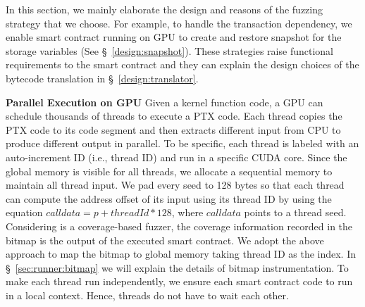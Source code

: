 In this section, we mainly elaborate the design and reasons of the fuzzing strategy that we choose. 
For example, to handle the transaction dependency, we enable smart contract running on GPU to create and restore snapshot for the storage variables (See \S~\ref{design:snapshot}). 
These strategies raise functional requirements to the smart contract and they can explain the design choices of the bytecode translation in \S~\ref{design:translator}.

%


\noindent \textbf{Parallel Execution on GPU}
Given a kernel function code, a GPU can schedule thousands of threads to execute a PTX code. 
%
Each thread copies the PTX code to its code segment and then extracts different input from CPU to produce different output in parallel. 
%
To be specific, each thread is labeled with an auto-increment ID (i.e., thread ID) and run in a specific CUDA core. 
Since the global memory is visible for all threads, we allocate a sequential memory to maintain all thread input. We pad every seed to 128 bytes so that each thread can compute the address offset of its input using its thread ID by using the equation $calldata = p + threadId * 128$, where $calldata$ points to a thread seed. 
%
Considering {\tool} is a coverage-based fuzzer, the coverage information recorded in the bitmap is the output of the executed smart contract. 
%
We adopt the above approach to map the bitmap to global memory taking thread ID as the index. 
%
In \S~\ref{sec:runner:bitmap} we will explain the details of bitmap instrumentation. 
%
To make each thread run independently, we ensure each smart contract code to run in a local context. Hence, threads do not have to wait each other.
%


